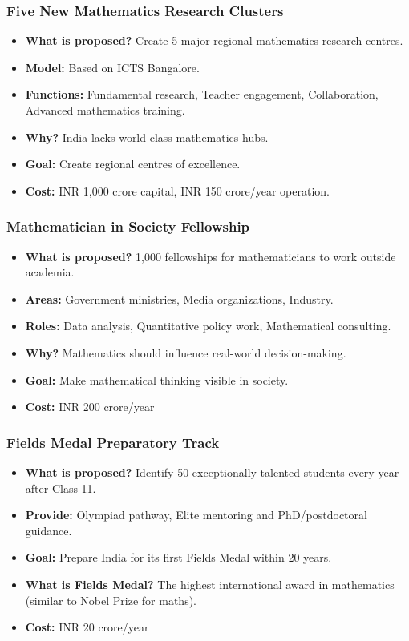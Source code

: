 \documentclass[12pt,a4paper]{article}
\begin{document}
\subsubsection{Five New Mathematics Research Clusters}
\begin{itemize}[leftmargin=*]
    \item \textbf{What is proposed?} Create 5 major regional mathematics research centres.
    \item \textbf{Model:} Based on ICTS Bangalore.
    \item \textbf{Functions:} Fundamental research, Teacher engagement, Collaboration, Advanced mathematics training.
    \item \textbf{Why?} India lacks world-class mathematics hubs.
    \item \textbf{Goal:} Create regional centres of excellence.
    \item \textbf{Cost:} INR 1,000 crore capital, INR 150 crore/year operation.
\end{itemize}

\subsubsection{Mathematician in Society Fellowship}
\begin{itemize}[leftmargin=*]
    \item \textbf{What is proposed?} 1,000 fellowships for mathematicians to work outside academia.
    \item \textbf{Areas:} Government ministries, Media organizations, Industry.
    \item \textbf{Roles:} Data analysis, Quantitative policy work, Mathematical consulting.
    \item \textbf{Why?} Mathematics should influence real-world decision-making.
    \item \textbf{Goal:} Make mathematical thinking visible in society.
    \item \textbf{Cost:} INR 200 crore/year
\end{itemize}

\subsubsection{Fields Medal Preparatory Track}
\begin{itemize}[leftmargin=*]
    \item \textbf{What is proposed?} Identify 50 exceptionally talented students every year after Class 11.
    \item \textbf{Provide:} Olympiad pathway, Elite mentoring and PhD/postdoctoral guidance.
    \item \textbf{Goal:} Prepare India for its first Fields Medal within 20 years.
    \item \textbf{What is Fields Medal?} The highest international award in mathematics (similar to Nobel Prize for maths).
    \item \textbf{Cost:} INR 20 crore/year
\end{itemize}
\end{document}
